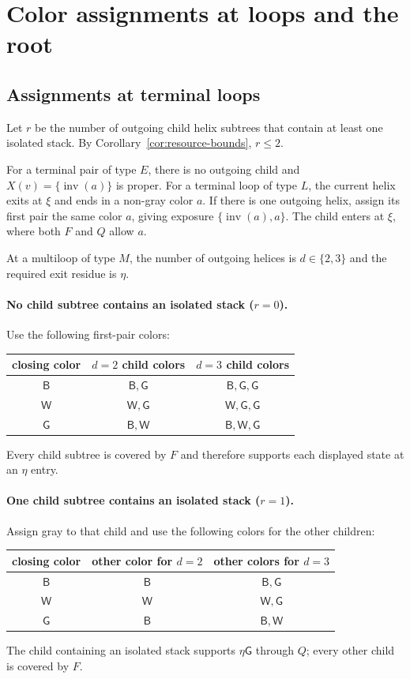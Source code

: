 \documentclass[11pt]{article}
\newcommand{\Bcol}{\mathsf{B}}
\newcommand{\Wcol}{\mathsf{W}}
\newcommand{\Gray}{\mathsf{G}}
\newcommand{\inv}{\operatorname{inv}}
\begin{document}
\section{Color assignments at loops and the root}
\label{sec:allocations}

\subsection{Assignments at terminal loops}

Let $r$ be the number of outgoing child helix subtrees that contain at least one isolated stack.  By Corollary~\ref{cor:resource-bounds}, $r\le2$.

For a terminal pair of type $E$, there is no outgoing child and $X(v)=\{\inv(a)\}$ is proper.  For a terminal loop of type $L$, the current helix exits at $\xi$ and ends in a non-gray color $a$.  If there is one outgoing helix, assign its first pair the same color $a$, giving exposure $\{\inv(a),a\}$.  The child enters at $\xi$, where both $F$ and $Q$ allow $a$.

At a multiloop of type $M$, the number of outgoing helices is $d\in\{2,3\}$ and the required exit residue is $\eta$.

\paragraph{No child subtree contains an isolated stack ($r=0$).}
Use the following first-pair colors:
\begin{center}
\begin{tabular}{ccc}
\toprule
closing color & $d=2$ child colors & $d=3$ child colors \\
\midrule
$\Bcol$ & $\Bcol,\Gray$ & $\Bcol,\Gray,\Gray$ \\
$\Wcol$ & $\Wcol,\Gray$ & $\Wcol,\Gray,\Gray$ \\
$\Gray$ & $\Bcol,\Wcol$ & $\Bcol,\Wcol,\Gray$ \\
\bottomrule
\end{tabular}
\end{center}
Every child subtree is covered by $F$ and therefore supports each displayed state at an $\eta$ entry.

\paragraph{One child subtree contains an isolated stack ($r=1$).}
Assign gray to that child and use the following colors for the other children:
\begin{center}
\begin{tabular}{ccc}
\toprule
closing color & other color for $d=2$ & other colors for $d=3$ \\
\midrule
$\Bcol$ & $\Bcol$ & $\Bcol,\Gray$ \\
$\Wcol$ & $\Wcol$ & $\Wcol,\Gray$ \\
$\Gray$ & $\Bcol$ & $\Bcol,\Wcol$ \\
\bottomrule
\end{tabular}
\end{center}
The child containing an isolated stack supports $\eta\Gray$ through $Q$; every other child is covered by $F$.
\end{document}
